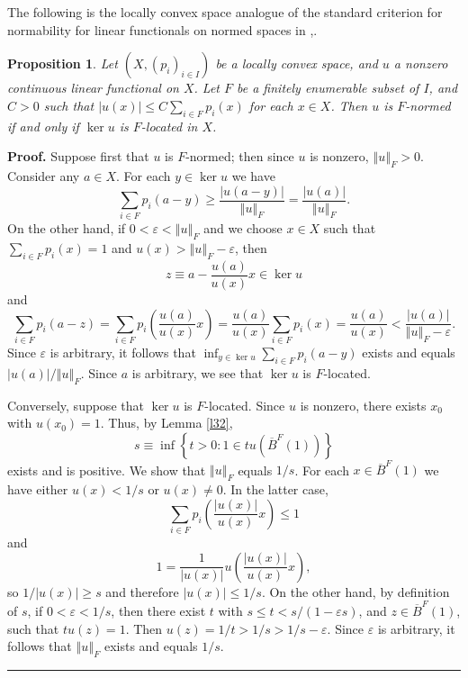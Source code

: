 \documentclass{article}%
\newtheorem{proposition}[theorem]{Proposition}
\newenvironment{proof}[1][Proof]{\noindent\textbf{#1.} }{\ \rule{0.5em}{0.5em}}
\begin{document}
The following is the locally convex space analogue of the standard criterion
for normability for linear functionals on normed spaces in \cite[Proposition
8, page 258]{Bishop},\cite[2.3.6]{BVtech}.

\begin{proposition}
\label{p33}Let $\left(  X,\left(  p_{i}\right)  _{i\in I}\right)  $ be a
locally convex space, and $u$ a nonzero continuous linear functional on $X$.
Let $F$ be a finitely enumerable subset of $I$, and $C>0$ such that
$\left\vert u(x)\right\vert \leq C\sum_{i\in F}p_{i}(x)$ for each $x\in X$.
Then $u$ is $F$-normed if and only if $\ker u$ is $F$-located in $X$.
\end{proposition}

\begin{proof}
Suppose first that $u$ is $F$-normed; then since $u$ is nonzero, $\left\Vert
u\right\Vert _{F}>0$. Consider any $a\in X$. For each $y\in\ker u$ we have%
\[
\sum_{i\in F}p_{i}(a-y)\geq\frac{\left\vert u(a-y)\right\vert }{\left\Vert
u\right\Vert _{F}}=\frac{\left\vert u(a)\right\vert }{\left\Vert u\right\Vert
_{F}}.
\]
On the other hand, if $0<\varepsilon<\left\Vert u\right\Vert _{F}$ and we
choose $x\in X$ such that $\sum_{i\in F}p_{i}(x)=1$ and $u(x)>\left\Vert
u\right\Vert _{F}-\varepsilon$, then%
\[
z\equiv a-\frac{u(a)}{u(x)}x\in\ker u
\]
and%
\[
\sum_{i\in F}p_{i}(a-z)=\sum_{i\in F}p_{i}\left(  \frac{u(a)}{u(x)}x\right)
=\frac{u(a)}{u(x)}\sum_{i\in F}p_{i}\left(  x\right)  =\frac{u(a)}{u(x)}%
<\frac{\left\vert u(a)\right\vert }{\left\Vert u\right\Vert _{F}-\varepsilon
}.
\]
Since $\varepsilon$ is arbitrary, it follows that $\inf_{y\in\ker u}\sum_{i\in
F}p_{i}(a-y)$ exists and equals $\left\vert u(a)\right\vert /\left\Vert
u\right\Vert _{F}$. Since $a$ is arbitrary, we see that $\ker u$ is $F$-located.

Conversely, suppose that $\ker u$ is $F$-located. Since $u$ is nonzero, there
exists $x_{0}$ with $u(x_{0})=1$. Thus, by Lemma \ref{l32},%
\[
s\equiv\inf\left\{  t>0:1\in tu(\overline{B}^{F}(1))\right\}
\]
exists and is positive. We show that $\left\Vert u\right\Vert _{F}$ equals
$1/s$. For each $x\in\overline{B}^{F}(1)$ we have either $u(x)<1/s$ or
$u(x)\neq0$. In the latter case,
\[
\sum_{i\in F}p_{i}\left(  \frac{\left\vert u(x)\right\vert }{u(x)}x\right)
\leq1
\]
and%
\[
1=\frac{1}{\left\vert u(x)\right\vert }u\left(  \frac{\left\vert
u(x)\right\vert }{u(x)}x\right)  ,
\]
so $1/\left\vert u(x)\right\vert \geq s$ and therefore $\left\vert
u(x)\right\vert \leq1/s$. On the other hand, by definition of $s$, if
$0<\varepsilon<1/s$, then there exist $t$ with $s\leq t<s/\left(
1-\varepsilon s\right)  $, and $z\in\overline{B}^{F}(1)$, such that $tu(z)=1$.
Then $u(z)=1/t>1/s>1/s-\varepsilon$. Since $\varepsilon$ is arbitrary, it
follows that $\left\Vert u\right\Vert _{F}$ exists and equals $1/s$.
\end{proof}
\end{document}
